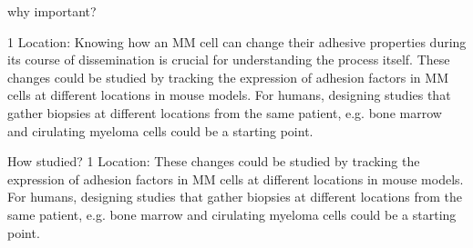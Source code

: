 why important?

1 Location: Knowing how an MM cell can change their adhesive properties during its course of
dissemination is crucial for understanding the process itself. These changes
could be studied by tracking the expression of adhesion factors in MM cells at
different locations in mouse models. For humans, designing studies that gather
biopsies at different locations from the same patient, e.g. bone marrow and cirulating
myeloma cells could be a starting point.

How studied?
1 Location: These changes could be studied by tracking the
expression of adhesion factors in MM cells at different locations in mouse
models. For humans, designing studies that gather biopsies at different
locations from the same patient, e.g. bone marrow and cirulating myeloma cells
could be a starting point.




